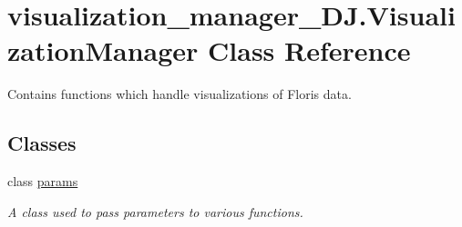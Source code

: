 \hypertarget{classvisualization__manager___d_j_1_1_visualization_manager}{}\section{visualization\+\_\+manager\+\_\+\+D\+J.\+Visualization\+Manager Class Reference}
\label{classvisualization__manager___d_j_1_1_visualization_manager}


Contains functions which handle visualizations of Floris data.  


\subsection*{Classes}
\begin{DoxyCompactItemize}
\item 
class \mbox{\hyperlink{classvisualization__manager___d_j_1_1_visualization_manager_1_1params}{params}}
\begin{DoxyCompactList}\small\item\em A class used to pass parameters to various functions. \end{DoxyCompactList}\end{DoxyCompactItemize}
